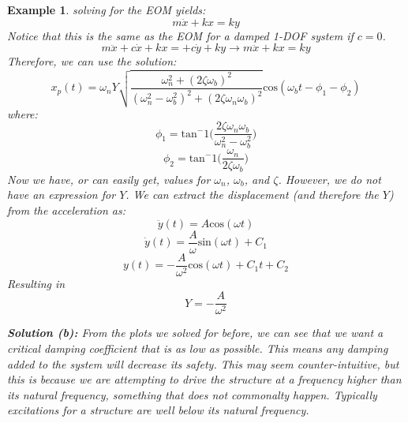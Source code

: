 \documentclass[12pt,letter]{article}
\newtheorem{ex}{Example}
\numberwithin{ex}{section} %
\newenvironment{example}{\begin{mdframed}[middlelinewidth=0.5mm]\begin{ex}\normalfont}{\end{ex}\end{mdframed}}
\numberwithin{re}{section} %
\begin{document}
\begin{example}
					solving for the EOM yields:
					\begin{equation}
						m\ddot{x} + kx = ky
					\end{equation} 				
					Notice that this is the same as the EOM for a damped 1-DOF system if $c=0$.	
					\begin{equation}
					m\ddot{x} + c\dot{x} + kx = + c\dot{y} + ky \rightarrow m\ddot{x} + kx = ky
					\end{equation}
					Therefore, we can use the solution:
					\begin{equation}
						x_p(t) = 	\omega_n Y   \sqrt{\frac{\omega_n^2 + (2 \zeta \omega_b)^2 }{(\omega_n^2 - \omega_b^2)^2 +  (2\zeta \omega_n \omega_b)^2} }  \text{cos}(\omega_bt - \phi_1 - \phi_2)
					\end{equation}
					where:
					\begin{equation}
						\phi_1 = \text{tan}^-1\bigg(\frac{2\zeta \omega_n \omega_b}{\omega_n^2 - \omega_b^2}\bigg)
					\end{equation}	
					\begin{equation}
						\phi_2 = \text{tan}^-1\bigg(\frac{\omega_n}{2\zeta \omega_b}\bigg)
					\end{equation}
					Now we have, or can easily get, values for $\omega_n$, $\omega_b$, and $\zeta$. However, we do not have an expression for $Y$. We can extract the displacement (and therefore the $Y$) from the acceleration as:
					\begin{equation}
						\ddot{y}(t) = A \text{cos}(\omega t)
					\end{equation} 				
					\begin{equation}
						\dot{y}(t) = \frac{A}{\omega} \text{sin}(\omega t) + C_1
					\end{equation} 					
					\begin{equation}
						y(t) = - \frac{A}{\omega^2} \text{cos}(\omega t) + C_1t + C_2
					\end{equation} 					
					Resulting in 
					\begin{equation}
						Y = -\frac{A}{\omega^2}
					\end{equation} 			
					
					\noindent\textbf{Solution (b):} From the plots we solved for before, we can see that we want a critical damping coefficient that is as low as possible. This means any damping added to the system will decrease its safety. This may seem counter-intuitive, but this is because we are attempting to drive the structure at a frequency higher than its natural frequency, something that does not commonalty happen. Typically excitations for a structure are well below its natural frequency.  			
				
				\end{example}			
		
\end{document}
